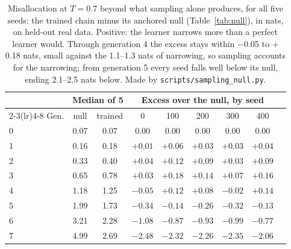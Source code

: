 \documentclass[10pt,letterpaper]{article}
\begin{document}
\begin{table}[H]
\centering
\caption{ Misallocation at $T{=}0.7$ beyond what sampling alone produces, for all five seeds: the trained chain minus its anchored null (Table~\ref{tab:null}), in nats, on held-out real data. Positive: the learner narrows more than a perfect learner would. Through generation 4 the excess stays within $-$0.05 to $+$0.18 nats, small against the 1.1--1.3 nats of narrowing, so sampling accounts for the narrowing; from generation 5 every seed falls well below its null, ending 2.1--2.5 nats below. Made by \texttt{scripts/sampling\_null.py}.}
\small
\begin{tabular}{@{}lcccccccc@{}}
\toprule
& \multicolumn{2}{c}{Median of 5} & \multicolumn{5}{c}{Excess over the null, by seed} \\
\cmidrule(lr){2-3}\cmidrule(lr){4-8}
Gen. & null & trained & 0 & 100 & 200 & 300 & 400 \\
\midrule
0 & 0.07 & 0.07 & 0.00 & 0.00 & 0.00 & 0.00 & 0.00 \\
1 & 0.16 & 0.18 & $+0.01$ & $+0.06$ & $+0.03$ & $+0.03$ & $+0.04$ \\
2 & 0.33 & 0.40 & $+0.04$ & $+0.12$ & $+0.09$ & $+0.03$ & $+0.09$ \\
3 & 0.65 & 0.78 & $+0.03$ & $+0.18$ & $+0.14$ & $+0.07$ & $+0.16$ \\
4 & 1.18 & 1.25 & $-0.05$ & $+0.12$ & $+0.08$ & $-0.02$ & $+0.14$ \\
5 & 1.99 & 1.73 & $-0.34$ & $-0.14$ & $-0.26$ & $-0.32$ & $-0.13$ \\
6 & 3.21 & 2.28 & $-1.08$ & $-0.87$ & $-0.93$ & $-0.99$ & $-0.77$ \\
7 & 4.99 & 2.69 & $-2.48$ & $-2.32$ & $-2.26$ & $-2.35$ & $-2.06$ \\
\bottomrule
\end{tabular}
\label{tab:excess}
\end{table}
\end{document}
